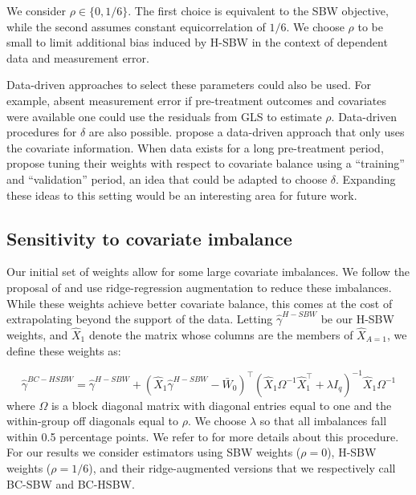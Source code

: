 \documentclass[aoas]{imsart}
\theoremstyle{plain}
\theoremstyle{remark}
\begin{document}
We consider $\rho \in \{0, 1/6\}$. The first choice is equivalent to the SBW objective, while the second assumes constant equicorrelation of $1/6$. We choose $\rho$ to be small to limit additional bias induced by H-SBW in the context of dependent data and measurement error.

Data-driven approaches to select these parameters could also be used. For example, absent measurement error if pre-treatment outcomes and covariates were available one could use the residuals from GLS to estimate $\rho$. Data-driven procedures for $\delta$ are also possible. \cite{wang2020minimal} propose a data-driven approach that only uses the covariate information. When data exists for a long pre-treatment period, \cite{abadie2015comparative} propose tuning their weights with respect to covariate balance using a ``training'' and ``validation'' period, an idea that could be adapted to choose $\delta$. Expanding these ideas to this setting would be an interesting area for future work.

\subsection{Sensitivity to covariate imbalance}

Our initial set of weights allow for some large covariate imbalances. We follow the proposal of \cite{ben2021augmented} and use ridge-regression augmentation to reduce these imbalances. While these weights achieve better covariate balance, this comes at the cost of extrapolating beyond the support of the data. Letting $\hat{\gamma}^{H-SBW}$ be our H-SBW weights, and $\hat{X}_1$ denote the matrix whose columns are the members of $\hat{X}_{A=1}$, we define these weights as:

\begin{equation}
\hat{\gamma}^{BC-HSBW} = \hat{\gamma}^{H-SBW} + (\hat{X}_1\hat{\gamma}^{H-SBW} - \bar{W}_0)^\top(\hat{X}_1\Omega^{-1}\hat{X}_1^\top + \lambda I_q)^{-1}\hat{X}_1\Omega^{-1}
\end{equation}
%
where $\Omega$ is a block diagonal matrix with diagonal entries equal to one and the within-group off diagonals equal to $\rho$. We choose $\lambda$ so that all imbalances fall within 0.5 percentage points. We refer to \cite{ben2021augmented} for more details about this procedure. For our results we consider estimators using SBW weights ($\rho = 0$), H-SBW weights ($\rho = 1/6$), and their ridge-augmented versions that we respectively call BC-SBW and BC-HSBW.
\end{document}
